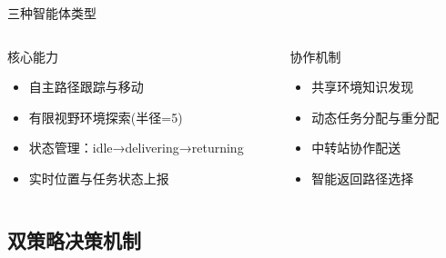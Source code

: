 \documentclass[
10pt,
aspectratio=169,
]{beamer}
\begin{document}
\begin{frame}{三种智能体类型}
    \begin{columns}
        \begin{column}{0.5\textwidth}
            \begin{exampleblock}{核心能力}
                \begin{itemize}
                    \item 自主路径跟踪与移动
                    \item 有限视野环境探索(半径=5)
                    \item 状态管理：idle→delivering→returning
                    \item 实时位置与任务状态上报
                \end{itemize}
            \end{exampleblock}
        \end{column}
        \begin{column}{0.5\textwidth}
            \begin{exampleblock}{协作机制}
                \begin{itemize}
                    \item 共享环境知识发现
                    \item 动态任务分配与重分配
                    \item 中转站协作配送
                    \item 智能返回路径选择
                \end{itemize}
            \end{exampleblock}
        \end{column}
    \end{columns}
\end{frame}

\subsection{双策略决策机制}
\end{document}
